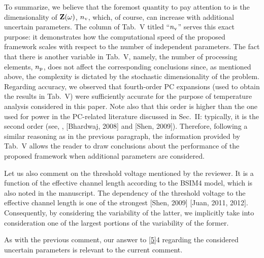 \begin{authors}
To summarize, we believe that the foremost quantity to pay attention to is the dimensionality of $\mathbf{Z}(\omega)$, ${n_\text{v}}$, which, of course, can increase with additional uncertain parameters.
The column of Tab.~V titled ``${n_\text{v}}$'' serves this exact purpose: it demonstrates how the computational speed of the proposed framework scales with respect to the number of independent parameters.
The fact that there is another variable in Tab.~V, namely, the number of processing elements, ${n_\text{p}}$, does not affect the corresponding conclusions since, as mentioned above, the complexity is dictated by the stochastic dimensionality of the problem.
Regarding accuracy, we observed that fourth-order PC expansions (used to obtain the results in Tab.~V) were sufficiently accurate for the purpose of temperature analysis considered in this paper.
Note also that this order is higher than the one used for power in the PC-related literature discussed in Sec.~II: typically, it is the second order (see, \eg, [Bhardwaj, 2008] and [Shen, 2009]).
Therefore, following a similar reasoning as in the previous paragraph, the information provided by Tab.~V allows the reader to draw conclusions about the performance of the proposed framework when additional parameters are considered.

Let us also comment on the threshold voltage mentioned by the reviewer.
It is a function of the effective channel length according to the BSIM4 model, which is also noted in the manuscript.
The dependency of the threshold voltage to the effective channel length is one of the strongest [Shen, 2009] [Juan, 2011, 2012].
Consequently, by considering the variability of the latter, we implicitly take into consideration one of the largest portions of the variability of the former.

As with the previous comment, our answer to \cref{5}{4} regarding the considered uncertain parameters is relevant to the current comment.

\begin{actions}
\end{actions}
\end{authors}
